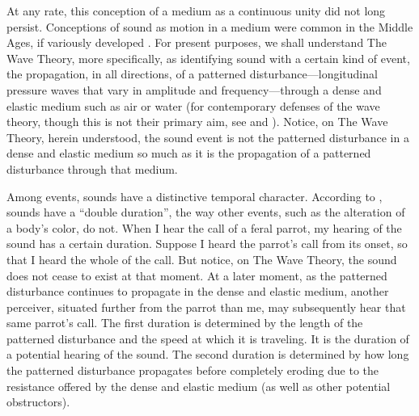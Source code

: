 At any rate, this conception of a medium as a continuous unity did not long persist. Conceptions of sound as motion in a medium were common in the Middle Ages, if variously developed \citep{Pasnau:2000aa}. For present purposes, we shall understand The Wave Theory, more specifically, as identifying sound with a certain kind of event, the propagation, in all directions, of a patterned disturbance---longitudinal pressure waves that vary in amplitude and frequency---through a dense and elastic medium such as air or water (for contemporary defenses of the wave theory, though this is not their primary aim, see \citealt{OShaughnessy:2009aa} and \citealt{Sorensen:2009aa}). Notice, on The Wave Theory, herein understood, the sound event is not the patterned disturbance in a dense and elastic medium so much as it is the propagation of a patterned disturbance through that medium. 

Among events, sounds have a distinctive temporal character. According to \citet{OShaughnessy:2009aa}, sounds have a ``double duration'', the way other events, such as the alteration of a body's color, do not. When I hear the call of a feral parrot, my hearing of the sound has a certain duration. Suppose I heard the parrot's call from its onset, so that I heard the whole of the call. But notice, on The Wave Theory, the sound does not cease to exist at that moment. At a later moment, as the patterned disturbance continues to propagate in the dense and elastic medium, another perceiver, situated further from the parrot than me, may subsequently hear that same parrot's call. The first duration is determined by the length of the patterned disturbance and the speed at which it is traveling. It is the duration of a potential hearing of the sound. The second duration is determined by how long the patterned disturbance propagates before completely eroding due to the resistance offered by the dense and elastic medium (as well as other potential obstructors).

